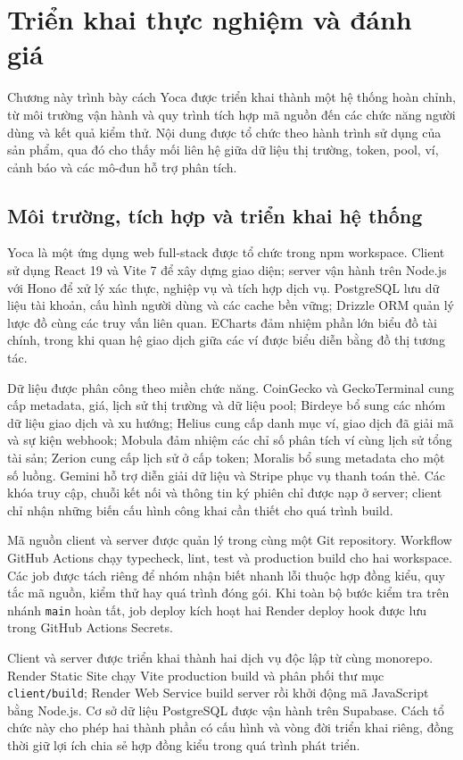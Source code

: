 \chapter{Triển khai thực nghiệm và đánh giá}
\label{Chapter5}

Chương này trình bày cách Yoca được triển khai thành một hệ thống hoàn chỉnh, từ môi trường vận hành và quy trình tích hợp mã nguồn đến các chức năng người dùng và kết quả kiểm thử. Nội dung được tổ chức theo hành trình sử dụng của sản phẩm, qua đó cho thấy mối liên hệ giữa dữ liệu thị trường, token, pool, ví, cảnh báo và các mô-đun hỗ trợ phân tích.

\section{Môi trường, tích hợp và triển khai hệ thống}
\label{sec:moi_truong_trien_khai}

Yoca là một ứng dụng web full-stack được tổ chức trong npm workspace. Client sử dụng React 19 và Vite 7 để xây dựng giao diện; server vận hành trên Node.js với Hono để xử lý xác thực, nghiệp vụ và tích hợp dịch vụ. PostgreSQL lưu dữ liệu tài khoản, cấu hình người dùng và các cache bền vững; Drizzle ORM quản lý lược đồ cùng các truy vấn liên quan. ECharts đảm nhiệm phần lớn biểu đồ tài chính, trong khi quan hệ giao dịch giữa các ví được biểu diễn bằng đồ thị tương tác.

Dữ liệu được phân công theo miền chức năng. CoinGecko và GeckoTerminal cung cấp metadata, giá, lịch sử thị trường và dữ liệu pool; Birdeye bổ sung các nhóm dữ liệu giao dịch và xu hướng; Helius cung cấp danh mục ví, giao dịch đã giải mã và sự kiện webhook; Mobula đảm nhiệm các chỉ số phân tích ví cùng lịch sử tổng tài sản; Zerion cung cấp lịch sử ở cấp token; Moralis bổ sung metadata cho một số luồng. Gemini hỗ trợ diễn giải dữ liệu và Stripe phục vụ thanh toán thẻ. Các khóa truy cập, chuỗi kết nối và thông tin ký phiên chỉ được nạp ở server; client chỉ nhận những biến cấu hình công khai cần thiết cho quá trình build.

Mã nguồn client và server được quản lý trong cùng một Git repository. Workflow GitHub Actions chạy typecheck, lint, test và production build cho hai workspace. Các job được tách riêng để nhóm nhận biết nhanh lỗi thuộc hợp đồng kiểu, quy tắc mã nguồn, kiểm thử hay quá trình đóng gói. Khi toàn bộ bước kiểm tra trên nhánh \texttt{main} hoàn tất, job deploy kích hoạt hai Render deploy hook được lưu trong GitHub Actions Secrets.

Client và server được triển khai thành hai dịch vụ độc lập từ cùng monorepo. Render Static Site chạy Vite production build và phân phối thư mục \texttt{client/build}; Render Web Service build server rồi khởi động mã JavaScript bằng Node.js. Cơ sở dữ liệu PostgreSQL được vận hành trên Supabase. Cách tổ chức này cho phép hai thành phần có cấu hình và vòng đời triển khai riêng, đồng thời giữ lợi ích chia sẻ hợp đồng kiểu trong quá trình phát triển.

